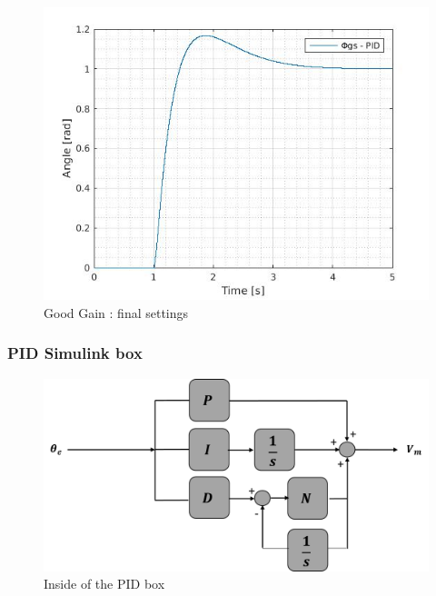 \begin{figure}[H]
  \centering
  \includegraphics[scale=0.5]{figures/GG5.jpg}
  \caption[LABEL] {Good Gain : final settings}
\end{figure}


  
\subsubsection{PID Simulink box}
\begin{figure}[H]
\centering
\includegraphics[scale=0.4]{figures/controller_box.png}
\caption{Inside of the PID box}
\label{dcmotor_circuit}
\end{figure}

